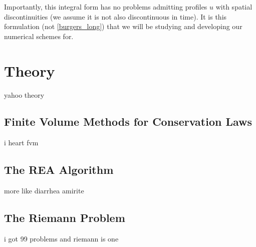 \documentclass{myproject}
\begin{document}
Importantly, this integral form has no problems admitting profiles $u$ with spatial discontinuities (we assume it is not also discontinuous in time). It is this formulation (not \eqref{burgers_long}) that we will be studying and developing our numerical schemes for. 

\section{Theory}

yahoo theory

\subsection{Finite Volume Methods for Conservation Laws}

i heart fvm

\subsection{The REA Algorithm}

more like diarrhea amirite

\subsection{The Riemann Problem}

i got 99 problems and riemann is one
\end{document}
